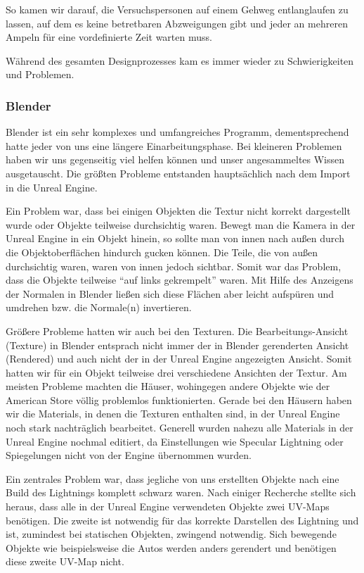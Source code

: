 \documentclass{Bericht}
\begin{document}
		So kamen wir darauf, die Versuchspersonen auf einem Gehweg entlanglaufen zu lassen, auf dem es keine betretbaren Abzweigungen gibt und jeder an mehreren Ampeln für eine vordefinierte Zeit warten muss. 
		
		Während des gesamten Designprozesses kam es immer wieder zu Schwierigkeiten und Problemen.
		
		\subsubsection{Blender}
			Blender ist ein sehr komplexes und umfangreiches Programm, dementsprechend hatte jeder von uns eine längere Einarbeitungsphase. Bei kleineren Problemen haben wir uns gegenseitig viel helfen können und unser angesammeltes Wissen ausgetauscht. Die größten Probleme entstanden hauptsächlich nach dem Import in die Unreal Engine. 

			Ein Problem war, dass bei einigen Objekten die Textur nicht korrekt dargestellt wurde oder Objekte teilweise durchsichtig waren. Bewegt man die Kamera in der Unreal Engine in ein Objekt hinein, so sollte man von innen nach außen durch die Objektoberflächen hindurch gucken können. Die Teile, die von außen durchsichtig waren, waren von innen jedoch sichtbar. Somit war das Problem, dass die Objekte teilweise "`auf links gekrempelt"' waren. Mit Hilfe des Anzeigens der Normalen in Blender ließen sich diese Flächen aber leicht aufspüren und umdrehen bzw. die Normale(n) invertieren.
			
			Größere Probleme hatten wir auch bei den Texturen. Die Bearbeitungs-Ansicht (Texture) in Blender entsprach nicht immer der in Blender gerenderten Ansicht (Rendered) und auch nicht der in der Unreal Engine angezeigten Ansicht. Somit hatten wir für ein Objekt teilweise drei verschiedene Ansichten der Textur. Am meisten Probleme machten die Häuser, wohingegen andere Objekte wie der American Store völlig problemlos funktionierten. Gerade bei den Häusern haben wir die Materials, in denen die Texturen enthalten sind, in der Unreal Engine noch stark nachträglich bearbeitet.
			Generell wurden nahezu alle Materials in der Unreal Engine nochmal editiert, da Einstellungen wie Specular Lightning oder Spiegelungen nicht von der Engine übernommen wurden.
			
			Ein zentrales Problem war, dass jegliche von uns erstellten Objekte nach eine Build des Lightnings komplett schwarz waren. Nach einiger Recherche stellte sich heraus, dass alle in der Unreal Engine verwendeten Objekte zwei UV-Maps benötigen. Die zweite ist notwendig für das korrekte Darstellen des Lightning und ist, zumindest bei statischen Objekten, zwingend notwendig. Sich bewegende Objekte wie beispielsweise die Autos werden anders gerendert und benötigen diese zweite UV-Map nicht. 
		
\end{document}
